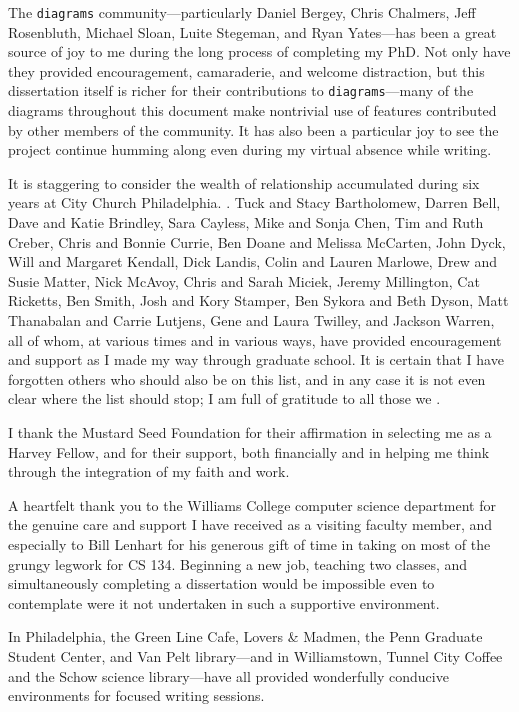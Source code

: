 The \texttt{diagrams} community---particularly Daniel Bergey, Chris
Chalmers, Jeff Rosenbluth, Michael Sloan, Luite Stegeman, and Ryan
Yates---has been a great source of joy to me during the long process
of completing my PhD.  Not only have they provided encouragement,
camaraderie, and welcome distraction, but this dissertation itself is
richer for their contributions to \texttt{diagrams}---many of the
diagrams throughout this document make nontrivial use of features
contributed by other members of the community.  It has also been a
particular joy to see the project continue humming along even during
my virtual absence while writing.

It is staggering to consider the wealth of relationship accumulated
during six years at City Church Philadelphia. .  Tuck and Stacy Bartholomew, Darren Bell, Dave and
Katie Brindley, Sara Cayless, Mike and Sonja Chen, Tim and Ruth
Creber, Chris and Bonnie Currie, Ben Doane and Melissa McCarten, John
Dyck, Will and Margaret Kendall, Dick Landis, Colin and Lauren
Marlowe, Drew and Susie Matter, Nick McAvoy, Chris and Sarah Miciek,
Jeremy Millington, Cat Ricketts, Ben Smith, Josh and Kory Stamper, Ben
Sykora and Beth Dyson, Matt Thanabalan and Carrie Lutjens, Gene and
Laura Twilley, and Jackson Warren, all of whom, at various times and
in various ways, have provided encouragement and support as I made my
way through graduate school. It is certain that I have forgotten
others who should also be on this list, and in any case it is not even
clear where the list should stop; I am full of gratitude to all those
we .

I thank the Mustard Seed Foundation for their affirmation in selecting
me as a Harvey Fellow, and for their support, both financially and in
helping me think through the integration of my faith and work.

A heartfelt thank you to the Williams College computer science
department for the genuine care and support I have received as a
visiting faculty member, and especially to Bill Lenhart for his
generous gift of time in taking on most of the grungy legwork for CS
134.  Beginning a new job, teaching two classes, and simultaneously
completing a dissertation would be impossible even to contemplate were
it not undertaken in such a supportive environment.

In Philadelphia, the Green Line Cafe, Lovers \& Madmen, the Penn
Graduate Student Center, and Van Pelt library---and in Williamstown,
Tunnel City Coffee and the Schow science library---have all provided
wonderfully conducive environments for focused writing sessions.


